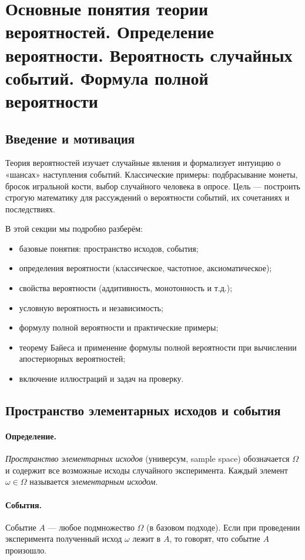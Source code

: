 \section{Основные понятия теории вероятностей. Определение вероятности. Вероятность случайных событий. Формула полной вероятности}

\subsection*{Введение и мотивация}
Теория вероятностей изучает случайные явления и формализует интуицию о «шансах» наступления событий. Классические примеры: подбрасывание монеты, бросок игральной кости, выбор случайного человека в опросе. Цель — построить строгую математику для рассуждений о вероятности событий, их сочетаниях и последствиях.

\bigskip
В этой секции мы подробно разберём:
\begin{itemize}
  \item базовые понятия: пространство исходов, события;
  \item определения вероятности (классическое, частотное, аксиоматическое);
  \item свойства вероятности (аддитивность, монотонность и т.д.);
  \item условную вероятность и независимость;
  \item формулу полной вероятности и практические примеры;
  \item теорему Байеса и применение формулы полной вероятности при вычислении апостериорных вероятностей;
  \item включение иллюстраций и задач на проверку.
\end{itemize}

\subsection{Пространство элементарных исходов и события}
\paragraph{Определение.} \emph{Пространство элементарных исходов} (универсум, sample space) обозначается $\Omega$ и содержит все возможные исходы случайного эксперимента. Каждый элемент $\omega\in\Omega$ называется \emph{элементарным исходом}.

\paragraph{События.} Событие $A$ — любое подмножество $\Omega$ (в базовом подходе). Если при проведении эксперимента полученный исход $\omega$ лежит в $A$, то говорят, что событие $A$ произошло.

